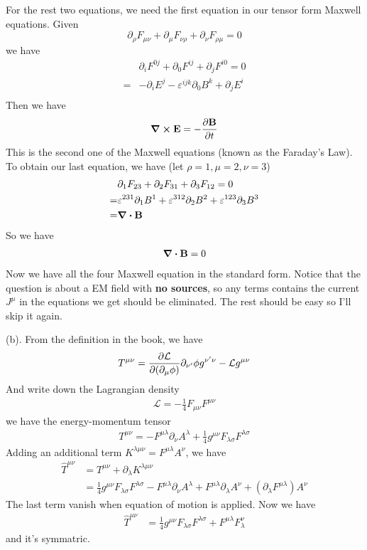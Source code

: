 \documentclass{article}
\begin{document}
For the rest two equations, we need the first equation in our tensor form Maxwell equations. Given
\begin{equation*}
  \partial_{\rho}F_{\mu\nu}+\partial_{\mu}F_{\nu\rho}+\partial_{\nu}F_{\rho\mu}=0
\end{equation*}
we have
\begin{align*}
&\partial_iF^{0j}+\partial_0F^{ij}+\partial_jF^{i0}=0\\
=&-\partial_iE^j-\varepsilon^{ijk}\partial_0B^k+\partial_jE^i\\
\end{align*}
Then we have
\begin{align}
\curl{\vb{E}}=-\pdv{\vb{B}}{t}
\end{align}
This is the second one of the Maxwell equations (known as the Faraday's Law). To obtain our last equation, we have (let $\rho=1,\mu=2,\nu=3$)
\begin{align*}
&\partial_{1}F_{23}+\partial_{2}F_{31}+\partial_{3}F_{12}=0\\
=&\varepsilon^{231}\partial_1B^1+\varepsilon^{312}\partial_2B^2+\varepsilon^{123}\partial_3B^3\\
=&\div{\vb{B}}
\end{align*}
So we have
\begin{align}
\div{\vb{B}}=0
\end{align}
Now we have all the four Maxwell equation in the standard form. Notice that the question is about a EM field with {\bf{no sources}}, so any terms contains the current $J^{\mu}$ in the equations we get should be eliminated. The rest should be easy so I'll skip it again.

\makebox{\phantom{2.1}}\quad(b). From the definition in the book, we have
\begin{align}
T^{\mu\nu}=\pdv{\mathcal{L}}{(\partial_{\mu}\phi)}\partial_{\nu'}\phi g^{\nu'\nu}-\mathcal{L}g^{\mu\nu}
\end{align}
And write down the Lagrangian density
\begin{align}
\mathcal{L}=-\frac{1}{4}F_{\mu\nu}F^{\mu\nu}
\end{align}
we have the energy-momentum tensor
\begin{align}
T^{\mu\nu}=-F^{\mu\lambda}\partial_{\nu}A^{\lambda}+\frac{1}{4}g^{\mu\nu}F_{\lambda\sigma}F^{\lambda\sigma}
\end{align}
Adding an additional term $K^{\lambda\mu\nu}=F^{\mu\lambda}A^{\nu}$, we have
\begin{align*}
\hat{T}^{\mu\nu}&=T^{\mu\nu}+\partial_{\lambda}K^{\lambda\mu\nu}\\
&=\frac{1}{4}g^{\mu\nu}F_{\lambda\sigma}F^{\lambda\sigma}-F^{\mu\lambda}\partial_{\nu}A^{\lambda}+F^{\mu\lambda}\partial_{\lambda}A^{\nu}+(\partial_{\lambda}F^{\mu\lambda})A^{\nu}
\end{align*}
The last term vanish when equation of motion is applied. Now we have
\begin{align}
  \hat{T}^{\mu\nu}&=\frac{1}{4}g^{\mu\nu}F_{\lambda\sigma}F^{\lambda\sigma}+F^{\mu\lambda}F_{\lambda}^{\nu}
\end{align}
and it's symmatric.
\end{document}
